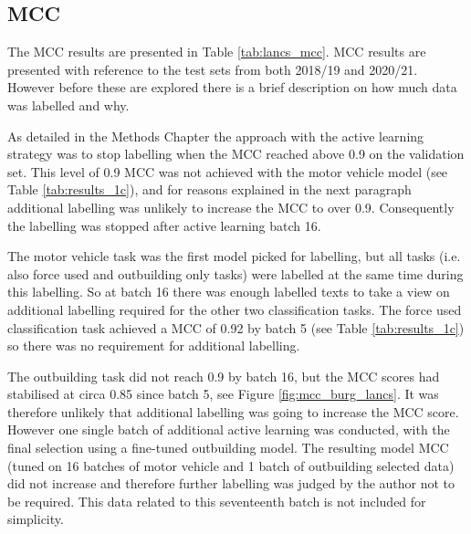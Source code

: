 \subsection{MCC} The MCC results are presented in Table \ref{tab:lancs_mcc}. MCC results are presented with reference to the test sets from both 2018/19 and 2020/21. However before these are explored there is a brief description on how much data was labelled and why.

 As detailed in the Methods Chapter the approach with the active learning strategy was to stop labelling when the MCC reached above 0.9 on the validation set. This level of 0.9 MCC was not achieved with the motor vehicle model (see Table \ref{tab:results_1c}), and for reasons explained in the next paragraph additional labelling was unlikely to increase the MCC to over 0.9.  Consequently the labelling was stopped after active learning batch 16.  

The motor vehicle task was the first model picked for labelling, but all tasks (i.e. also force used and outbuilding only tasks) were labelled at the same time  during this labelling. So at batch 16 there was enough labelled texts to take a view on additional labelling required for the other two classification tasks. The force used classification task achieved a MCC of 0.92 by batch 5 (see Table \ref{tab:results_1c}) so there was no requirement for additional labelling. 

The outbuilding task did not reach 0.9 by batch 16, but the MCC scores had stabilised at circa 0.85 since batch 5, see Figure \ref{fig:mcc_burg_lancs}. It was therefore unlikely that additional labelling was going to increase the MCC score. However one single batch of additional active learning was conducted, with the final selection using a fine-tuned outbuilding model. The resulting model MCC (tuned on 16 batches of motor vehicle and 1 batch of outbuilding selected data) did not increase and therefore further labelling was judged by the author not to be required. This data related to this seventeenth batch is not included for simplicity.

